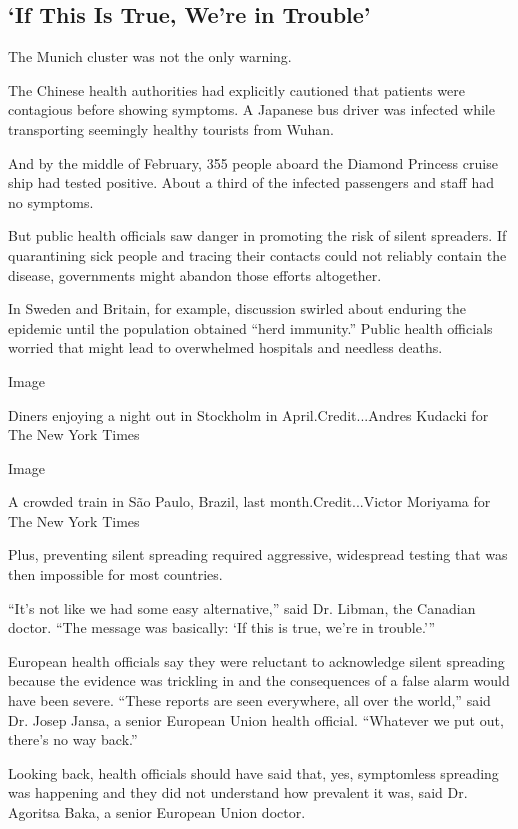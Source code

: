 \hypertarget{if-this-is-true-were-in-trouble}{%
\subsection{`If This Is True, We're in
Trouble'}\label{if-this-is-true-were-in-trouble}}

The Munich cluster was not the only warning.

The Chinese health authorities had explicitly cautioned that patients
were contagious before showing symptoms. A Japanese bus driver was
infected while transporting seemingly healthy tourists from Wuhan.

And by the middle of February, 355 people aboard the Diamond Princess
cruise ship had tested positive. About a third of the infected
passengers and staff had no symptoms.

But public health officials saw danger in promoting the risk of silent
spreaders. If quarantining sick people and tracing their contacts could
not reliably contain the disease, governments might abandon those
efforts altogether.

In Sweden and Britain, for example, discussion swirled about enduring
the epidemic until the population obtained ``herd immunity.'' Public
health officials worried that might lead to overwhelmed hospitals and
needless deaths.

Image

Diners enjoying a night out in Stockholm in April.Credit...Andres
Kudacki for The New York Times

Image

A crowded train in São Paulo, Brazil, last month.Credit...Victor
Moriyama for The New York Times

Plus, preventing silent spreading required aggressive, widespread
testing that was then impossible for most countries.

``It's not like we had some easy alternative,'' said Dr. Libman, the
Canadian doctor. ``The message was basically: `If this is true, we're in
trouble.'''

European health officials say they were reluctant to acknowledge silent
spreading because the evidence was trickling in and the consequences of
a false alarm would have been severe. ``These reports are seen
everywhere, all over the world,'' said Dr. Josep Jansa, a senior
European Union health official. ``Whatever we put out, there's no way
back.''

Looking back, health officials should have said that, yes, symptomless
spreading was happening and they did not understand how prevalent it
was, said Dr. Agoritsa Baka, a senior European Union doctor.

